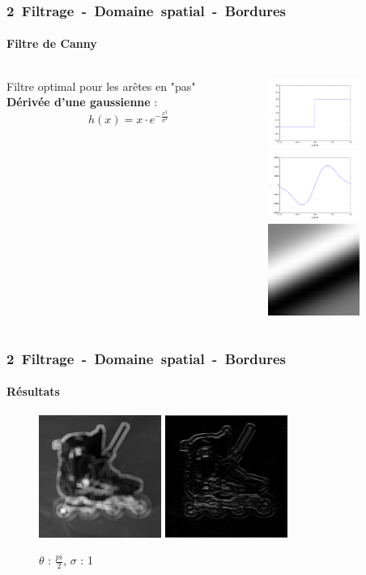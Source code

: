 \documentclass[french]{beamer}
\begin{document}
\begin{frame}
	\frametitle{\mbox{2 Filtrage - Domaine spatial - Bordures}}
	\framesubtitle{Filtre de Canny}
	\begin{columns}
		\begin{column}{5cm}
			Filtre optimal pour les arêtes en "pas"\\
			\textbf{Dérivée d'une gaussienne} :
			$$h(x) = x \cdot e^{-\frac{x^2}{\sigma^2}}$$
		\end{column}
		\begin{column}{5cm}
			\includegraphics[width=3cm]{images/step.png}\\
			\includegraphics[width=3cm]{images/gaussd1d.png}\\
			\includegraphics[width=3cm]{images/gaussd.png}
		\end{column}
	\end{columns}
\end{frame}

\begin{frame}
	\frametitle{\mbox{2 Filtrage - Domaine spatial - Bordures}}
	\framesubtitle{Résultats}
	\begin{figure}[!h]
		\centering
		\includegraphics[width=4cm]{images/roller_resp.jpg} \; \includegraphics[width = 4cm]{images/roller_filtered.jpg}
		\caption{$\theta$ : $\frac{pi}{2}$, $\sigma$ : 1}
	\end{figure}
\end{frame}
\end{document}
